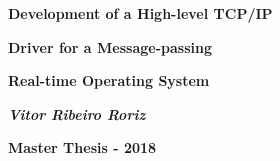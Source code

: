 \documentclass{article}
\begin{document}
\titlepage
\begin{center}
\vspace*{18\baselineskip}
\centerline{\Huge \textbf{Development of a High-level TCP/IP }}
\vspace{10pt}
\centerline{\Huge \textbf{Driver for a Message-passing}}
\vspace{10pt}
\centerline{\Huge \textbf{Real-time Operating System}}



\vspace*{12\baselineskip}
{\Huge \textbf{\textit{Vitor Ribeiro Roriz}}}


\vspace*{20\baselineskip}
{\Huge \textbf{Master Thesis - 2018}}
\end{center}
\end{document}
